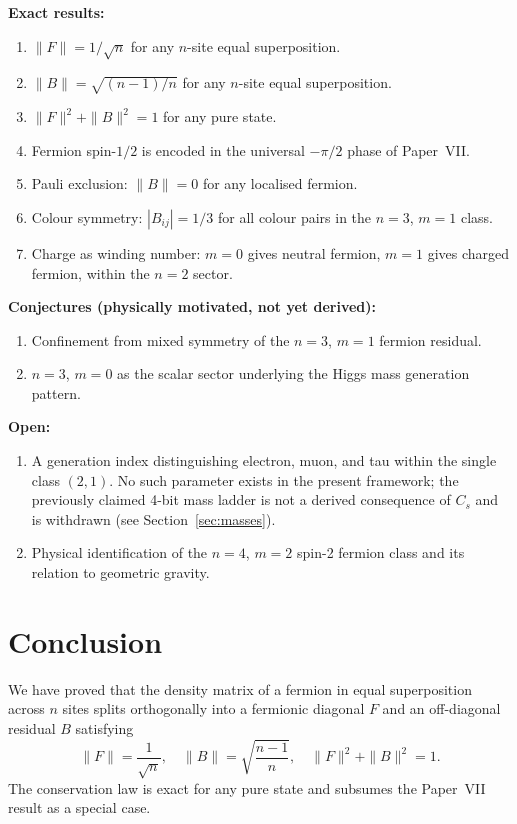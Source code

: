 \documentclass[11pt]{article}
\begin{document}
\textbf{Exact results:}
\begin{enumerate}
\item $\|F\| = 1/\sqrt{n}$ for any $n$-site equal superposition.
\item $\|B\| = \sqrt{(n-1)/n}$ for any $n$-site equal superposition.
\item $\|F\|^2 + \|B\|^2 = 1$ for any pure state.
\item Fermion spin-$1/2$ is encoded in the universal $-\pi/2$ phase
      of Paper~VII.
\item Pauli exclusion: $\|B\| = 0$ for any localised fermion.
\item Colour symmetry: $|B_{ij}| = 1/3$ for all colour pairs in the
      $n{=}3$, $m{=}1$ class.
\item Charge as winding number: $m = 0$ gives neutral fermion,
      $m = 1$ gives charged fermion, within the $n{=}2$ sector.
\end{enumerate}

\textbf{Conjectures (physically motivated, not yet derived):}
\begin{enumerate}
\item[8.] Confinement from mixed symmetry of the $n{=}3$, $m{=}1$
      fermion residual.
\item[9.] $n{=}3$, $m{=}0$ as the scalar sector underlying the
      Higgs mass generation pattern.
\end{enumerate}

\textbf{Open:}
\begin{enumerate}
\item[10.] A generation index distinguishing electron, muon, and tau
      within the single class $(2,1)$.
      No such parameter exists in the present framework; the
      previously claimed 4-bit mass ladder is not a derived
      consequence of $C_s$ and is withdrawn (see
      Section~\ref{sec:masses}).
\item[11.] Physical identification of the $n{=}4$, $m{=}2$ spin-2
      fermion class and its relation to geometric gravity.
\end{enumerate}

\section{Conclusion}
\label{sec:conclusion}

We have proved that the density matrix of a fermion in equal
superposition across $n$ sites splits orthogonally into a fermionic
diagonal $F$ and an off-diagonal residual $B$ satisfying
\[
  \|F\| = \frac{1}{\sqrt{n}}, \quad
  \|B\| = \sqrt{\frac{n-1}{n}}, \quad
  \|F\|^2 + \|B\|^2 = 1.
\]
The conservation law is exact for any pure state and subsumes the
Paper~VII result as a special case.
\end{document}
